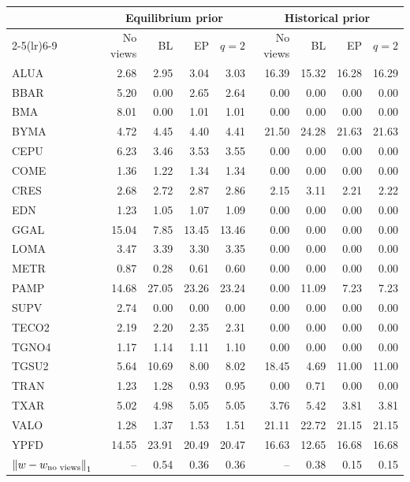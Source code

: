 \begin{tabular}{lrrrrrrrr}
\toprule
 & \multicolumn{4}{c}{Equilibrium prior} & \multicolumn{4}{c}{Historical prior} \\
\cmidrule(lr){2-5}\cmidrule(lr){6-9}
 & No views & BL & EP & $q=2$ & No views & BL & EP & $q=2$ \\
\midrule
ALUA & 2.68 & 2.95 & 3.04 & 3.03 & 16.39 & 15.32 & 16.28 & 16.29 \\
BBAR & 5.20 & 0.00 & 2.65 & 2.64 & 0.00 & 0.00 & 0.00 & 0.00 \\
BMA & 8.01 & 0.00 & 1.01 & 1.01 & 0.00 & 0.00 & 0.00 & 0.00 \\
BYMA & 4.72 & 4.45 & 4.40 & 4.41 & 21.50 & 24.28 & 21.63 & 21.63 \\
CEPU & 6.23 & 3.46 & 3.53 & 3.55 & 0.00 & 0.00 & 0.00 & 0.00 \\
COME & 1.36 & 1.22 & 1.34 & 1.34 & 0.00 & 0.00 & 0.00 & 0.00 \\
CRES & 2.68 & 2.72 & 2.87 & 2.86 & 2.15 & 3.11 & 2.21 & 2.22 \\
EDN & 1.23 & 1.05 & 1.07 & 1.09 & 0.00 & 0.00 & 0.00 & 0.00 \\
GGAL & 15.04 & 7.85 & 13.45 & 13.46 & 0.00 & 0.00 & 0.00 & 0.00 \\
LOMA & 3.47 & 3.39 & 3.30 & 3.35 & 0.00 & 0.00 & 0.00 & 0.00 \\
METR & 0.87 & 0.28 & 0.61 & 0.60 & 0.00 & 0.00 & 0.00 & 0.00 \\
PAMP & 14.68 & 27.05 & 23.26 & 23.24 & 0.00 & 11.09 & 7.23 & 7.23 \\
SUPV & 2.74 & 0.00 & 0.00 & 0.00 & 0.00 & 0.00 & 0.00 & 0.00 \\
TECO2 & 2.19 & 2.20 & 2.35 & 2.31 & 0.00 & 0.00 & 0.00 & 0.00 \\
TGNO4 & 1.17 & 1.14 & 1.11 & 1.10 & 0.00 & 0.00 & 0.00 & 0.00 \\
TGSU2 & 5.64 & 10.69 & 8.00 & 8.02 & 18.45 & 4.69 & 11.00 & 11.00 \\
TRAN & 1.23 & 1.28 & 0.93 & 0.95 & 0.00 & 0.71 & 0.00 & 0.00 \\
TXAR & 5.02 & 4.98 & 5.05 & 5.05 & 3.76 & 5.42 & 3.81 & 3.81 \\
VALO & 1.28 & 1.37 & 1.53 & 1.51 & 21.11 & 22.72 & 21.15 & 21.15 \\
YPFD & 14.55 & 23.91 & 20.49 & 20.47 & 16.63 & 12.65 & 16.68 & 16.68 \\
\midrule
$\left\lVert w - w_{\text{no views}} \right\rVert_1$ & -- & 0.54 & 0.36 & 0.36 & -- & 0.38 & 0.15 & 0.15 \\
\bottomrule
\end{tabular}
